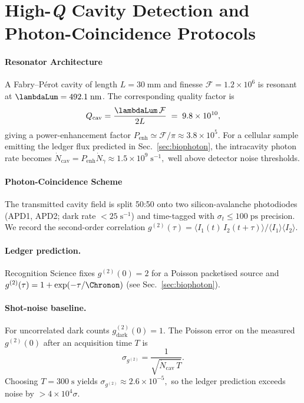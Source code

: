 \documentclass[11pt,oneside]{book}
\begin{document}
{%

\section{High-\textit{Q} Cavity Detection and Photon-Coincidence Protocols}
\label{sec:cavity-detection}

\paragraph{Resonator Architecture}

A Fabry–Pérot cavity of length
\(L = 30\;\text{mm}\)
and finesse
\(\mathcal{F} = 1.2\times10^{6}\)
is resonant at
\(\lambdaLum = 492.1\;\text{nm}\).
The corresponding quality factor is
\[
   Q_{\text{cav}}
   =
   \frac{\lambdaLum\,\mathcal{F}}{2L}
   \;=\;
   9.8\times10^{10},
\]
giving a power-enhancement factor
\(P_{\text{enh}}\simeq\mathcal{F}/\pi\approx3.8\times10^{5}\).
For a cellular sample emitting the ledger flux predicted in
Sec.~\ref{sec:biophoton},
the intracavity photon rate becomes
\(
   \dot N_{\text{cav}}=
   P_{\text{enh}}\dot N_{\gamma}
   \approx1.5\times10^{9}\;\text{s}^{-1},
\)
well above detector noise thresholds.

\paragraph{Photon-Coincidence Scheme}

The transmitted cavity field is split 50:50 onto two
silicon-avalanche photodiodes (APD1, APD2; dark rate \(<25\;\text{s}^{-1}\))
and time-tagged with \(\sigma_{t}\le100\;\text{ps}\) precision.
We record the second-order correlation
\(
   g^{(2)}(\tau)=
   \langle I_{1}(t)\,I_{2}(t+\tau)\rangle/
   \langle I_{1}\rangle\langle I_{2}\rangle.
\)

\paragraph{Ledger prediction.}
Recognition Science fixes
\(
   g^{(2)}(0) = 2
\)
for a Poisson packetised source and
\(
   g^{(2)}(\tau)=1+\exp(-\tau/\Chronon)
\)
(see Sec.~\ref{sec:biophoton}).

\paragraph{Shot-noise baseline.}
For uncorrelated dark counts
\(
   g^{(2)}_{\text{dark}}(0)=1
\).
The Poisson error on the measured
\(g^{(2)}(0)\)
after an acquisition time \(T\) is
\[
   \sigma_{g^{(2)}} =
   \frac{1}{\sqrt{\dot N_{\text{cav}}\,T}}.
\]
Choosing \(T=300\;\text{s}\) yields
\(
   \sigma_{g^{(2)}}\approx2.6\times10^{-5},
\)
so the ledger prediction exceeds noise by \(>4\times10^{4}\sigma\).

}
\end{document}
